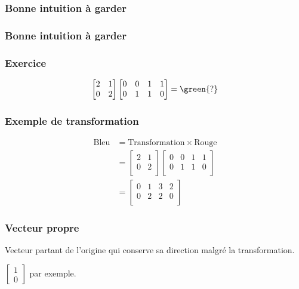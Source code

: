 \begin{frame}
  \frametitle{Bonne intuition à garder}

\end{frame}

\begin{frame}
  \frametitle{Bonne intuition à garder}

\end{frame}

\begin{frame}
  \frametitle{Exercice}
  \[
    \begin{bmatrix}
      2 & 1 \\
      0 & 2 \\
    \end{bmatrix}
    \begin{bmatrix}
      0 & 0 & 1 & 1 \\
      0 & 1 & 1 & 0 \\
    \end{bmatrix}
    = \green{?}
  \]
\end{frame}

\begin{frame}
  \frametitle{Exemple de transformation}

  \[
    \begin{aligned}
      \text{Bleu} & = \text{Transformation} \times \text{Rouge} \\
      & = \begin{bmatrix}
        2 & 1 \\
        0 & 2 \\
      \end{bmatrix}
      \begin{bmatrix}
        0 & 0 & 1 & 1 \\
        0 & 1 & 1 & 0 \\
      \end{bmatrix} \\
      & = \begin{bmatrix}
        0 & 1 & 3 & 2 \\
        0 & 2 & 2 & 0 \\
      \end{bmatrix}
    \end{aligned}
  \]
\end{frame}

\begin{frame}
  \frametitle{Vecteur propre}


  Vecteur partant de l'origine qui conserve sa direction malgré la transformation.

   \pause
  $\begin{bmatrix}1 \\0\end{bmatrix}$ par exemple.
\end{frame}

